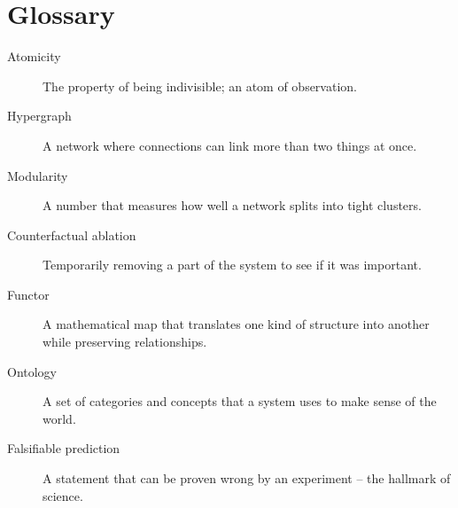 \section*{Glossary}

\begin{description}
    \item[Atomicity] The property of being indivisible; an atom of observation.
    \item[Hypergraph] A network where connections can link more than two things at once.
    \item[Modularity] A number that measures how well a network splits into tight clusters.
    \item[Counterfactual ablation] Temporarily removing a part of the system to see if it was important.
    \item[Functor] A mathematical map that translates one kind of structure into another while preserving relationships.
    \item[Ontology] A set of categories and concepts that a system uses to make sense of the world.
    \item[Falsifiable prediction] A statement that can be proven wrong by an experiment – the hallmark of science.
\end{description}